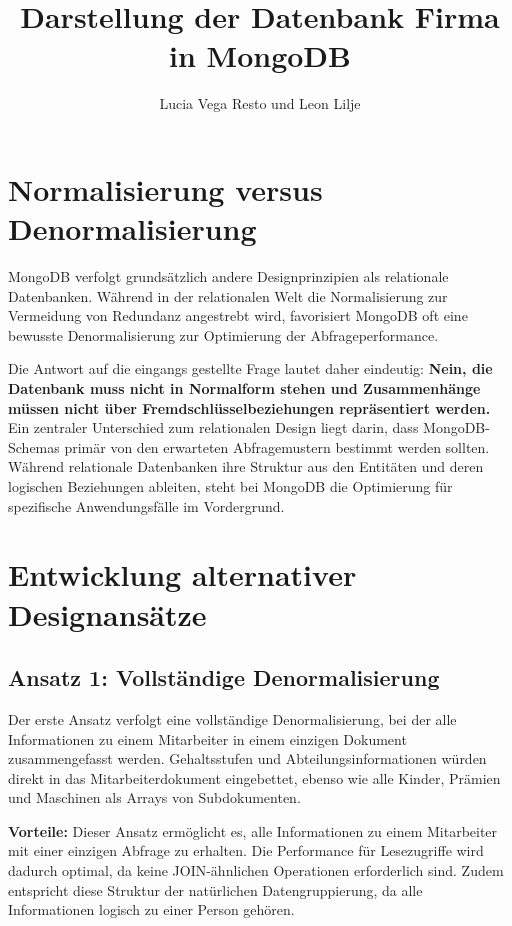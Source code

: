 \documentclass[12pt,a4paper]{article}
\title{Darstellung der Datenbank Firma in MongoDB}
\author{Lucia Vega Resto und Leon Lilje}
\date{}
\begin{document}
\maketitle
\vspace{-1cm}

\section{Normalisierung versus Denormalisierung}

MongoDB verfolgt grundsätzlich andere Designprinzipien als relationale Datenbanken. Während in der relationalen Welt die Normalisierung zur Vermeidung von Redundanz angestrebt wird, favorisiert MongoDB oft eine bewusste Denormalisierung zur Optimierung der Abfrageperformance.

Die Antwort auf die eingangs gestellte Frage lautet daher eindeutig: \textbf{Nein, die Datenbank muss nicht in Normalform stehen und Zusammenhänge müssen nicht über Fremdschlüsselbeziehungen repräsentiert werden.}
Ein zentraler Unterschied zum relationalen Design liegt darin, dass MongoDB-Schemas primär von den erwarteten Abfragemustern bestimmt werden sollten. Während relationale Datenbanken ihre Struktur aus den Entitäten und deren logischen Beziehungen ableiten, steht bei MongoDB die Optimierung für spezifische Anwendungsfälle im Vordergrund.

\section{Entwicklung alternativer Designansätze}

\subsection{Ansatz 1: Vollständige Denormalisierung}

Der erste Ansatz verfolgt eine vollständige Denormalisierung, bei der alle Informationen zu einem Mitarbeiter in einem einzigen Dokument zusammengefasst werden. Gehaltsstufen und Abteilungsinformationen würden direkt in das Mitarbeiterdokument eingebettet, ebenso wie alle Kinder, Prämien und Maschinen als Arrays von Subdokumenten.

\textbf{Vorteile:} Dieser Ansatz ermöglicht es, alle Informationen zu einem Mitarbeiter mit einer einzigen Abfrage zu erhalten. Die Performance für Lesezugriffe wird dadurch optimal, da keine JOIN-ähnlichen Operationen erforderlich sind. Zudem entspricht diese Struktur der natürlichen Datengruppierung, da alle Informationen logisch zu einer Person gehören.
\end{document}
